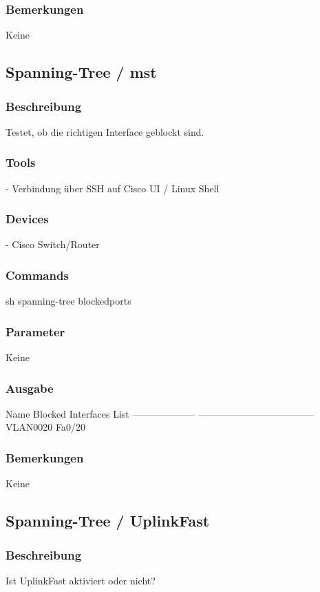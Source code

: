 \documentclass[a4,12pt]{scrartcl}
\begin{document}
\subsubsection{Bemerkungen}
Keine



\subsection{Spanning-Tree / mst}
\subsubsection{Beschreibung}
Testet, ob die richtigen Interface geblockt sind.
\subsubsection{Tools}
- Verbindung über SSH auf Cisco UI / Linux Shell
\subsubsection{Devices}
- Cisco Switch/Router
\subsubsection{Commands}
sh spanning-tree blockedports
\subsubsection{Parameter}
Keine
\subsubsection{Ausgabe}
Name                 Blocked Interfaces List\newline
-------------------- ------------------------------------\newline
VLAN0020             Fa0/20\newline
\subsubsection{Bemerkungen}
Keine


\subsection{Spanning-Tree / UplinkFast}
\subsubsection{Beschreibung}
Ist UplinkFast aktiviert oder nicht?
\end{document}
